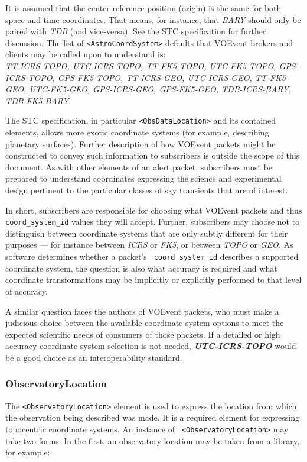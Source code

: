 \documentclass[11pt,a4paper]{ivoa}
\begin{document}
It is assumed that the center reference position (origin) is the same for both
space and time coordinates. That means, for instance, that \emph{BARY} should
only be paired with \emph{TDB} (and vice-versa). See the STC specification
\citep{2007ivoa.spec.1030R} %
for further discussion. The list of {\tt <AstroCoordSystem>} defaults that
VOEvent brokers and clients may be called upon to understand is: \\
\emph{TT-ICRS-TOPO, UTC-ICRS-TOPO, TT-FK5-TOPO, UTC-FK5-TOPO, GPS-ICRS-TOPO,
GPS-FK5-TOPO, TT-ICRS-GEO, UTC-ICRS-GEO, TT-FK5-GEO, UTC-FK5-GEO, GPS-ICRS-GEO,
GPS-FK5-GEO, TDB-ICRS-BARY, TDB-FK5-BARY}.

The STC specification, in particular {\tt <ObsDataLocation>} and its contained
elements, allows more exotic coordinate systems (for example, describing
planetary surfaces). Further description of how VOEvent packets might be
constructed to convey such information to subscribers is outside the scope of
this document. As with other elements of an alert packet, subscribers must be
prepared to understand coordinates expressing the science and experimental
design pertinent to the particular classes of sky transients that are of
interest.

In short, subscribers are responsible for choosing what VOEvent packets and thus
{\tt coord\_system\_id} values they will accept. Further, subscribers may choose
not to distinguish between coordinate systems that are only subtly different for
their purposes --- for instance between \emph{ICRS} or \emph{FK5}, or between
\emph{TOPO} or \emph{GEO}. As software determines whether a packet's {\tt
coord\_system\_id} describes a supported coordinate system, the question is also
what accuracy is required and what coordinate transformations may be implicitly
or explicitly performed to that level of accuracy.

A similar question faces the authors of VOEvent packets, who must make a
judicious choice between the available coordinate system options to meet the
expected scientific needs of consumers of those packets. If a detailed or high
accuracy coordinate system selection is not needed, \emph{\bf UTC-ICRS-TOPO}
would be a good choice as an interoperability standard.

\subsubsection{ObservatoryLocation}
\label{sec:3.4.2}
The {\tt <ObservatoryLocation>} element is used to express the location from
which the observation being described was made. It is a required element for
expressing topocentric coordinate systems. An instance of {\tt
<Observatory\-Location>} may take two forms. In the first, an observatory location
may be taken from a library, for example:
\end{document}
